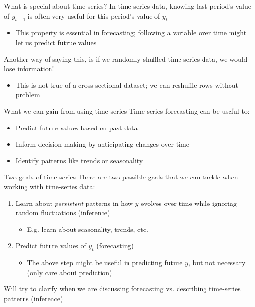 \documentclass[aspectratio=169,t,11pt,table]{beamer}
\begin{document}
\begin{frame}{What is special about time-series?}
  In time-series data, knowing last period's value of $y_{t-1}$ is often very useful for this period's value of $y_{t}$
  \begin{itemize}
    \item This property is essential in forecasting; following a variable over time might let us predict futrue values
  \end{itemize}

  \pause
  \bigskip
  Another way of saying this, is if we randomly shuffled time-series data, we would lose information!
  \begin{itemize}
    \item This is not true of a cross-sectional dataset; we can reshuffle rows without problem
  \end{itemize}
\end{frame}


\begin{frame}{What we can gain from using time-series}
  Time-series forecasting can be useful to:
  \begin{itemize}
    \item Predict future values based on past data

    \item Inform decision-making by anticipating changes over time

    \item Identify patterns like trends or seasonality
  \end{itemize}
\end{frame}

\begin{frame}{Two goals of time-series}
  There are two possible goals that we can tackle when working with time-series data:
  \begin{enumerate}
    \item Learn about \emph{persistent} patterns in how $y$ evolves over time while ignoring random fluctuations (inference)
    \begin{itemize}
      \item E.g. learn about seasonality, trends, etc.
    \end{itemize}

    \item Predict future values of $y_t$ (forecasting)
    \begin{itemize}
      \item The above step might be useful in predicting future $y$, but not necessary (only care about prediction)
    \end{itemize}
  \end{enumerate}

  \bigskip
  Will try to clarify when we are discussing forecasting vs. describing time-series patterns (inference)
\end{frame}
\end{document}
